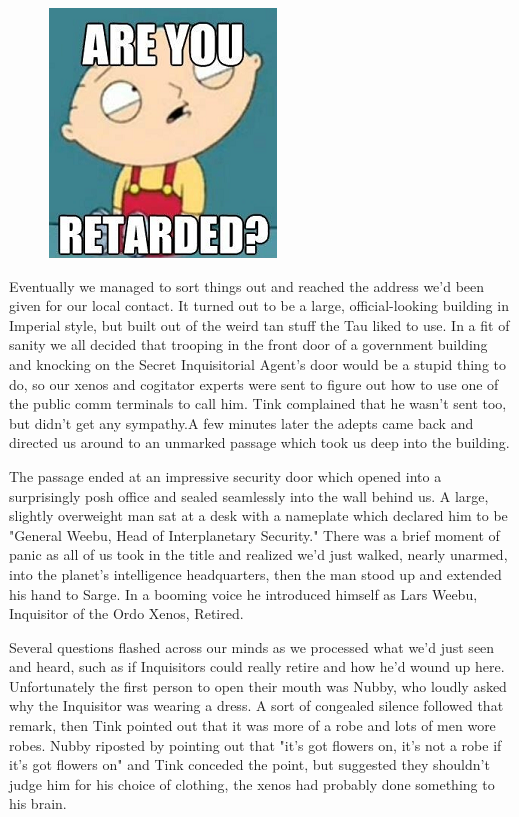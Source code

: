\begin{figure}
	\begin{center}
		\includegraphics[width=\figwidth]{pics/10/15.png}
	\end{center}
\end{figure}
Eventually we managed to sort things out and reached the address we'd been given for our local contact. 
It turned out to be a large, official-looking building in Imperial style, but built out of the weird tan stuff the Tau liked to use. 
In a fit of sanity we all decided that trooping in the front door of a government building and knocking on the Secret Inquisitorial Agent's door would be a stupid thing to do, so our xenos and cogitator experts were sent to figure out how to use one of the public comm terminals to call him. 
Tink complained that he wasn't sent too, but didn't get any sympathy.A few minutes later the adepts came back and directed us around to an unmarked passage which took us deep into the building.

The passage ended at an impressive security door which opened into a surprisingly posh office and sealed seamlessly into the wall behind us. 
A large, slightly overweight man sat at a desk with a nameplate which declared him to be "General Weebu, Head of Interplanetary Security." There was a brief moment of panic as all of us took in the title and realized we'd just walked, nearly unarmed, into the planet's intelligence headquarters, then the man stood up and extended his hand to Sarge. 
In a booming voice he introduced himself as Lars Weebu, Inquisitor of the Ordo Xenos, Retired.

Several questions flashed across our minds as we processed what we'd just seen and heard, such as if Inquisitors could really retire and how he'd wound up here. 
Unfortunately the first person to open their mouth was Nubby, who loudly asked why the Inquisitor was wearing a dress. 
A sort of congealed silence followed that remark, then Tink pointed out that it was more of a robe and lots of men wore robes. 
Nubby riposted by pointing out that "it's got flowers on, it's not a robe if it's got flowers on" and Tink conceded the point, but suggested they shouldn't judge him for his choice of clothing, the xenos had probably done something to his brain.

